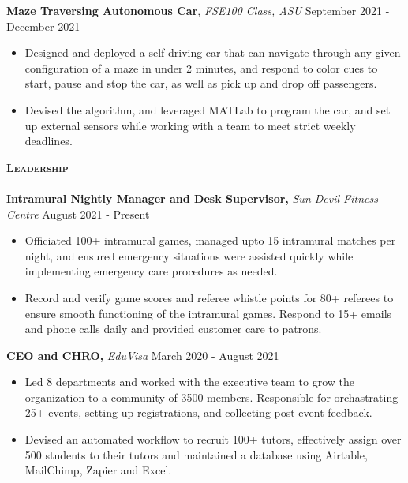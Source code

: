 \documentclass[10pt, a4paper]{article}
\newcommand{\lineunder} {
    \vspace*{-8pt} \\
    \hspace*{-18pt} \hrulefill \\
}
\newcommand{\header} [1] {
    {\hspace*{-15pt}\vspace*{3pt} \textsc{#1}}
    \vspace*{-6pt} \lineunder
}
\begin{document}
\textbf{Maze Traversing Autonomous Car}, \textit{FSE100 Class, ASU}
\hfill September 2021 - December 2021\\
\vspace{-2mm}
\begin{itemize}
    \itemsep-0.05em
    \item Designed and deployed a self-driving car that can navigate through any given configuration of a maze in under 2 minutes, and respond to color cues to start, pause and stop the car, as well as pick up and drop off passengers. 
    \item Devised the algorithm, and leveraged MATLab to program the car, and set up external sensors while working with a team to meet strict weekly deadlines. 
\end{itemize}






\header{\textbf{Leadership}}

\textbf{Intramural Nightly Manager and Desk Supervisor, } \textit{{Sun Devil Fitness Centre}}   \hfill August 2021 - Present\\
\vspace{-1mm}
\begin{itemize}
    \itemsep-0.05em
    \item Officiated 100+ intramural games, managed upto 15 intramural matches per night, and ensured emergency situations were assisted quickly while implementing emergency care procedures as needed.  
    \item Record and verify game scores and referee whistle points for 80+ referees to ensure smooth functioning of the intramural games. Respond to 15+ emails and phone calls daily and provided customer care to patrons.
\end{itemize}

\textbf{CEO and CHRO, }\textit{EduVisa}   \hfill March 2020 - August 2021\\
\vspace{-2mm}
\begin{itemize} \itemsep 1pt
    \itemsep-0.05em
	\item Led 8 departments and worked with the executive team to grow the organization to a community of 3500 members. Responsible for orchastrating 25+ events, setting up registrations, and collecting post-event feedback.
	\item Devised an automated workflow to recruit 100+ tutors, effectively assign over 500 students to their tutors and maintained a database using Airtable, MailChimp, Zapier and Excel.
	
\end{itemize}
\end{document}
